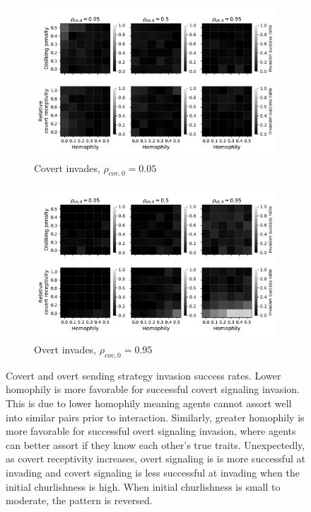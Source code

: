 \documentclass[11pt,letterpaper]{article}
\begin{document}
\begin{figure}[H]
  \centering
    \begin{subfigure}{0.49\textwidth}
      \includegraphics[width=\textwidth]{Figures/covert_invades.pdf}
      \caption{Covert invades, $\rho_{cov,0}=0.05$}
    \end{subfigure}
    \begin{subfigure}{0.49\textwidth}
      \includegraphics[width=\textwidth]{Figures/overt_invades.pdf}
      \caption{Overt invades, $\rho_{cov,0}=0.95$}
    \end{subfigure}
  \caption{Covert and overt sending strategy invasion success rates. 
    Lower homophily is more favorable for successful covert signaling invasion.
    This is due to lower homophily meaning agents cannot assort well into
    similar pairs prior to interaction.
    Similarly, greater homophily is more favorable for successful overt
    signaling invasion, where agents can better assort if they know each other's
    true traits. Unexpectedly, as covert receptivity increases, overt signaling
    is is more successful at invading and covert signaling is less successful
    at invading when the initial churlishness is high. When initial
    churlishness is small to moderate, the pattern is reversed.
  }
  \label{fig:cov-ov-invade}
\end{figure}
\end{document}
